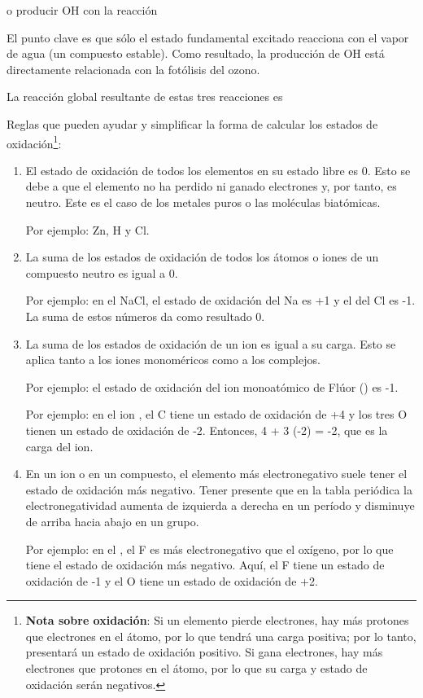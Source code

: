 o producir OH con la reacción

El punto clave es que sólo el estado fundamental excitado  reacciona con el vapor de agua (un compuesto estable). Como resultado, la producción de OH está directamente relacionada con la fotólisis del ozono.

La reacción global resultante de estas tres reacciones es


Reglas que pueden ayudar y simplificar la forma de calcular los estados de oxidación\footnote{\textbf{Nota sobre oxidación}: Si un elemento pierde electrones, hay más protones que electrones en el átomo, por lo que tendrá una carga positiva; por lo tanto, presentará un estado de oxidación positivo. Si gana electrones, hay más electrones que protones en el átomo, por lo que su carga y estado de oxidación serán negativos.}:
\begin{enumerate}
\item El estado de oxidación de todos los elementos en su estado libre es 0. Esto se debe a que el elemento no ha perdido ni ganado electrones y, por tanto, es neutro. Este es el caso de los metales puros o las moléculas biatómicas.

Por ejemplo: Zn, H y Cl.
\item La suma de los estados de oxidación de todos los átomos o iones de un compuesto neutro es igual a 0.

Por ejemplo: en el NaCl, el estado de oxidación del Na es +1 y el del Cl es -1. La suma de estos números da como resultado 0.
\item La suma de los estados de oxidación de un ion es igual a su carga. Esto se aplica tanto a los iones monoméricos como a los complejos.

Por ejemplo: el estado de oxidación del ion monoatómico de Flúor () es -1.

Por ejemplo: en el ion , el C tiene un estado de oxidación de +4 y los tres O tienen un estado de oxidación de -2. Entonces, 4 + 3 (-2) = -2, que es la carga del ion.
\item En un ion o en un compuesto, el elemento más electronegativo suele tener el estado de oxidación más negativo. Tener presente que en la tabla periódica la electronegatividad aumenta de izquierda a derecha en un período y disminuye de arriba hacia abajo en un grupo.

Por ejemplo: en el , el F es más electronegativo que el oxígeno, por lo que tiene el estado de oxidación más negativo. Aquí, el F tiene un estado de oxidación de -1 y el O tiene un estado de oxidación de +2.
\end{enumerate}

